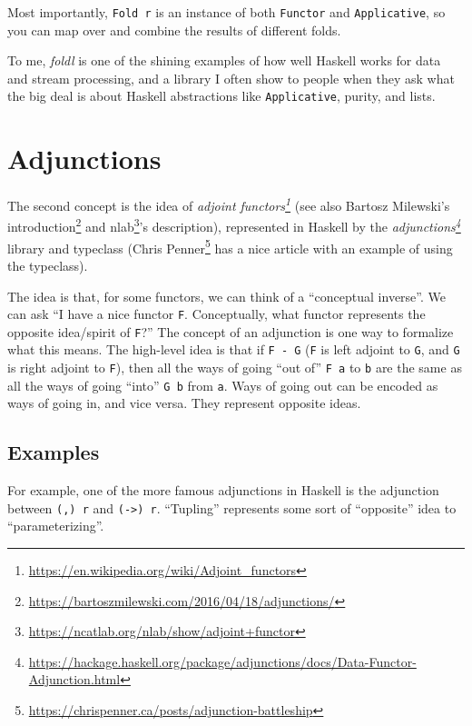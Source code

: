\documentclass[]{article}
\renewcommand{\href}[2]{#2\footnote{\url{#1}}}
\begin{document}
Most importantly, \texttt{Fold\ r} is an instance of both \texttt{Functor} and
\texttt{Applicative}, so you can map over and combine the results of different
folds.

To me, \emph{foldl} is one of the shining examples of how well Haskell works for
data and stream processing, and a library I often show to people when they ask
what the big deal is about Haskell abstractions like \texttt{Applicative},
purity, and lists.

\hypertarget{adjunctions}{%
\section{Adjunctions}\label{adjunctions}}

The second concept is the idea of
\emph{\href{https://en.wikipedia.org/wiki/Adjoint_functors}{adjoint functors}}
(see also \href{https://bartoszmilewski.com/2016/04/18/adjunctions/}{Bartosz
Milewski's introduction} and
\href{https://ncatlab.org/nlab/show/adjoint+functor}{nlab}'s description),
represented in Haskell by the
\emph{\href{https://hackage.haskell.org/package/adjunctions/docs/Data-Functor-Adjunction.html}{adjunctions}}
library and typeclass
(\href{https://chrispenner.ca/posts/adjunction-battleship}{Chris Penner} has a
nice article with an example of using the typeclass).

The idea is that, for some functors, we can think of a ``conceptual inverse''.
We can ask ``I have a nice functor \texttt{F}. Conceptually, what functor
represents the opposite idea/spirit of \texttt{F}?'' The concept of an
adjunction is one way to formalize what this means. The high-level idea is that
if \texttt{F\ -\textbar{}\ G} (\texttt{F} is left adjoint to \texttt{G}, and
\texttt{G} is right adjoint to \texttt{F}), then all the ways of going ``out
of'' \texttt{F\ a} to \texttt{b} are the same as all the ways of going ``into''
\texttt{G\ b} from \texttt{a}. Ways of going out can be encoded as ways of going
in, and vice versa. They represent opposite ideas.

\hypertarget{examples}{%
\subsection{Examples}\label{examples}}

For example, one of the more famous adjunctions in Haskell is the adjunction
between \texttt{(,)\ r} and \texttt{(-\textgreater{})\ r}. ``Tupling''
represents some sort of ``opposite'' idea to ``parameterizing''.
\end{document}
